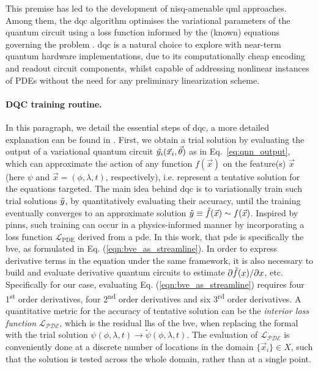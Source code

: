 \documentclass[aps,pra,a4paper,twocolumn,longbibliography,groupedaddress]{revtex4-2}
\begin{document}
This premise has led to the development of \gls{nisq}-amenable \gls{qml} approaches. Among them, the \gls{dqc} algorithm optimises the variational parameters of the quantum circuit using a loss function informed by the (known) equations governing the problem \cite{kyriienko2021solving}. \gls{dqc} is a natural choice to explore with near-term quantum hardware implementations, due to its computationally cheap encoding and readout circuit components, whilst capable of addressing nonlinear instances of PDEs without the need for any preliminary linearization scheme. 


\paragraph{DQC training routine.} 
In this paragraph, we detail the essential steps of \gls{dqc}, a more detailed explanation can be found in \cite{kyriienko2021solving}.
First, we obtain a trial solution by evaluating 
the output of a variational quantum circuit $\Tilde{y_i} (\Vec{x}_i, \Vec{\theta})$ as in Eq.~\eqref{eq:qnn_output}, which can approximate the action of any function $f(\Vec{x})$ on the feature(s) $\Vec{x}$ (here $\psi$ and $\Vec{x} = (\phi, \lambda, t)$, respectively), i.e. represent a tentative solution for the equations targeted. 
The main idea behind \gls{dqc} is to variationally train such trial solutions $\Tilde{y}$, by quantitatively evaluating their accuracy, until the training eventually converges to an approximate solution $\Tilde{y} \equiv \Tilde{f}(\Vec{x}) \sim f(\Vec{x})$.  
Inspired by \glspl{pinn}, such training can occur in a physics-informed manner by incorporating a loss function $\mathcal{L}_\text{PDE}$ derived from a \gls{pde}. In this work, that \gls{pde} is specifically the \gls{bve}, as formulated in Eq. (\ref{eqn:bve_as_streamline}). In order to express derivative terms in the equation under the same framework, it is also necessary to build and evaluate derivative quantum circuits to estimate $\partial \Tilde{f}(x) / \partial x$, etc.
Specifically for our case, evaluating Eq. (\ref{eqn:bve_as_streamline}) requires four 1\textsuperscript{st} order derivatives, four 2\textsuperscript{nd} order derivatives and six 3\textsuperscript{rd} order derivatives. 
A quantitative metric for the accuracy of tentative solution can be the \emph{interior loss function} $\mathcal{L_\text{PDE}}$, which is the residual \gls{lhs} of the \gls{bve}, when replacing the formal with the trial solution $\psi(\phi, \lambda, t) \rightarrow \tilde{\psi}(\phi, \lambda, t) $. The evaluation of $\mathcal{L_\text{PDE}}$ is conveniently done at a discrete number of locations in the domain $\{\Vec{x}_i\} \in X$, such that the solution is tested across the whole domain, rather than at a single point.
\end{document}

